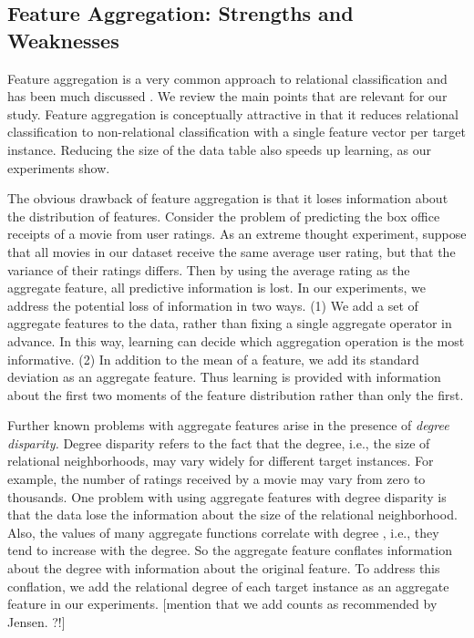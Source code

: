 \documentclass[conference]{IEEEtran}
\begin{document}

\subsection{Feature Aggregation: Strengths and Weaknesses} Feature aggregation is a very common approach to relational classification and has been much discussed \cite{Neville2003,Jensen2003,han2009}. We review the main points that are relevant for our study. Feature aggregation is conceptually attractive in that it reduces relational classification to non-relational classification with a single feature vector per target instance.  Reducing the size of the data table also speeds up learning, as our experiments show. 

The obvious drawback of feature aggregation is that it loses information about the distribution of features. Consider the problem of predicting the box office receipts of a movie from user ratings. As an extreme thought experiment, suppose that all movies in our dataset receive the same average user rating, but that the variance of their ratings differs. Then by using the average rating as the aggregate feature, all predictive information is lost. In our experiments, we address the potential loss of information in two ways. (1) We add a set of aggregate features to the data, rather than fixing a single aggregate operator in advance. In this way, learning can decide which aggregation operation is the most informative. (2) In addition to the mean of a feature, we add its standard deviation as an aggregate feature. Thus learning is provided with information about the first two moments of the feature distribution rather than only the first. 

Further known problems with aggregate features arise in the presence of {\em degree disparity.} Degree disparity refers to the fact that the degree, i.e., the size of relational neighborhoods, may vary widely for different target instances. For example, the number of ratings received by a movie may vary from zero to thousands. One problem with using aggregate features with degree disparity is that the data lose the information about the size of the relational neighborhood. Also, the values of many aggregate functions correlate with degree \cite{Jensen2003}, i.e., they tend to increase with the degree. So the aggregate feature conflates information about the degree with information about the original feature. To address this conflation, we add the relational degree of each target instance as an aggregate feature in our experiments.
[mention that we add counts as recommended by Jensen. ?!]
\end{document}
